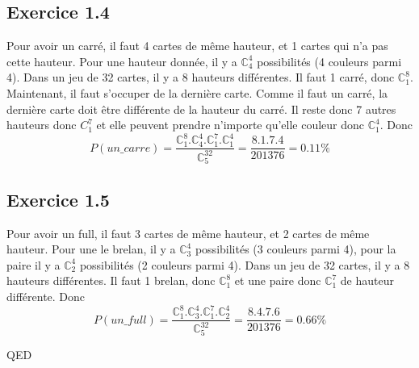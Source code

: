 \documentclass[]{book}
\theoremstyle{definition}
\newcommand{\bb}[1]{\mathbb{#1}}
\newcommand{\C}{\bb{C}}
\begin{document}
\subsection*{Exercice 1.4}
Pour avoir un carr\'e, il faut 4 cartes de m\^eme hauteur, et 1 cartes qui n'a pas cette hauteur. Pour une hauteur donn\'ee, il y a $\C_4^4$ possibilit\'es (4 couleurs parmi 4). Dans un jeu de 32 cartes, il y a 8 hauteurs diff\'erentes. Il faut 1 carr\'e, donc $\C_1^8$. Maintenant, il faut s'occuper de la derni\`ere carte. Comme il faut un carr\'e, la derni\`ere carte doit \^etre diff\'erente de la hauteur du carr\'e. Il reste donc 7 autres hauteurs donc $C_1^7$ et elle peuvent prendre n'importe qu'elle couleur donc $\C_1^4$. Donc
$$P(un\_carre) = \frac{\C_1^8.\C_4^4.\C_1^7.\C_1^4}{\C_5^{32}} = \frac{8.1.7.4}{201376} = 0.11\%$$


\subsection*{Exercice 1.5}
Pour avoir un full, il faut 3 cartes de m\^eme hauteur, et 2 cartes de m\^eme hauteur. Pour une le brelan, il y a $\C_3^4$ possibilit\'es (3 couleurs parmi 4), pour la paire il y a $\C_2^4$ possibilit\'es (2 couleurs parmi 4). Dans un jeu de 32 cartes, il y a 8 hauteurs diff\'erentes. Il faut 1 brelan, donc $\C_1^8$ et une paire donc $\C_1^7$ de hauteur diff\'erente.  Donc
$$P(un\_full) = \frac{\C_1^8.\C_3^4.\C_1^7.\C_2^4}{\C_5^{32}} = \frac{8.4.7.6}{201376} = 0.66\%$$


QED
\end{document}
